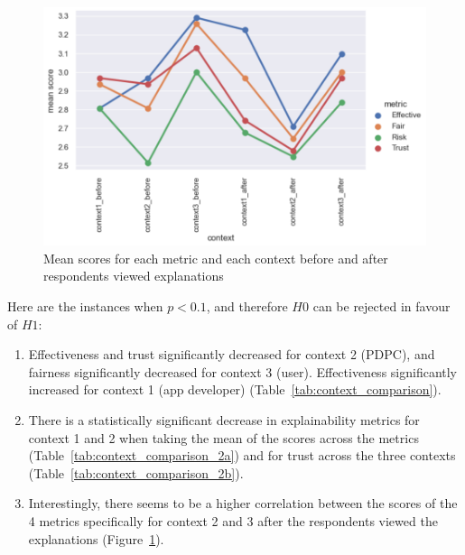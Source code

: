 \begin{figure}[!ht]
  \centering
  \includegraphics[width=1\linewidth]{figures/part2_part6_metric_comparison.png}
  \caption{Mean scores for each metric and each context before and after respondents viewed explanations}
  \label{fig:part2_part6_comparison}
\end{figure}


Here are the instances when $p<0.1$, and therefore $H0$ can be rejected in favour of $H1$:
\begin{enumerate}
    \item Effectiveness and trust significantly decreased for context 2 (PDPC), and fairness significantly decreased for context 3 (user). Effectiveness significantly increased for context 1 (app developer) (Table~\ref{tab:context_comparison}).
    \item There is a statistically significant decrease in explainability metrics for context 1 and 2 when taking the mean of the scores across the metrics (Table~\ref{tab:context_comparison_2a}) and for trust across the three contexts (Table~\ref{tab:context_comparison_2b}). 
    \item Interestingly, there seems to be a higher correlation between the scores of the 4 metrics specifically for context 2 and 3 after the respondents viewed the explanations (Figure~\ref{fig:part2_part6_comparison}).
\end{enumerate}

